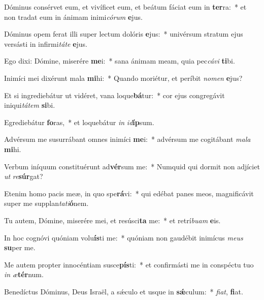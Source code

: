 \item Dóminus consérvet eum, et vivíficet eum, et beátum fáciat eum in \textbf{ter}ra:~* et non tradat eum in ánimam inimi\textit{có}\textit{rum} \textbf{e}jus.
\item Dóminus opem ferat illi super lectum dolóris \textbf{e}jus:~* univérsum stratum ejus versásti in infirmi\textit{tá}\textit{te} \textbf{e}jus.
\item Ego dixi: Dómine, miserére \textbf{me}i:~* sana ánimam meam, quia pec\textit{cá}\textit{vi} \textbf{ti}bi.
\item Inimíci mei dixérunt mala \textbf{mi}hi:~* Quando moriétur, et períbit \textit{no}\textit{men} \textbf{e}jus?
\item Et si ingrediebátur ut vidéret, vana loque\textbf{bá}tur:~* cor ejus congregávit iniqui\textit{tá}\textit{tem} \textbf{si}bi.
\item Egrediebátur \textbf{fo}ras,~* et loquebátur \textit{in} \textit{id}\textbf{íp}sum.
\item Advérsum me susurrábant omnes inimíci \textbf{me}i:~* advérsum me cogitábant \textit{ma}\textit{la} \textbf{mi}hi.
\item Verbum iníquum constituérunt ad\textbf{vér}sum me:~* Numquid qui dormit non adjíciet \textit{ut} \textit{re}\textbf{súr}gat?
\item Etenim homo pacis meæ, in quo spe\textbf{rá}vi:~* qui edébat panes meos, magnificávit super me supplan\textit{ta}\textit{ti}\textbf{ó}nem.
\item Tu autem, Dómine, miserére mei, et resúsci\textbf{ta} me:~* et retrí\textit{bu}\textit{am} \textbf{e}is.
\item In hoc cognóvi quóniam volu\textbf{ís}ti me:~* quóniam non gaudébit inimícus \textit{me}\textit{us} \textbf{su}per me.
\item Me autem propter innocéntiam susce\textbf{pís}ti:~* et confirmásti me in conspéctu tuo \textit{in} \textit{æ}\textbf{tér}num.
\item Benedíctus Dóminus, Deus Israël, a sǽculo et usque in \textbf{sǽ}culum:~* \textit{fi}\textit{at}, \textbf{fi}at.
